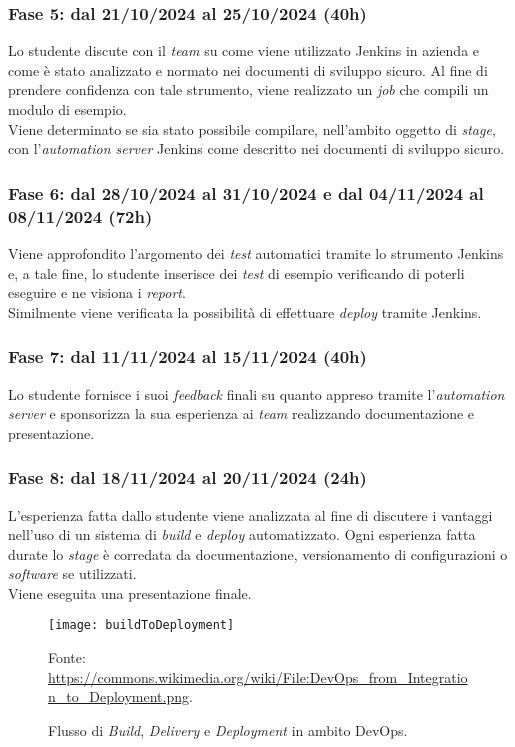 \subsubsection*{Fase 5: dal 21/10/2024 al 25/10/2024 (40h) }
Lo studente discute con il \emph{team} su come viene utilizzato Jenkins in azienda e come è stato analizzato e normato nei documenti di sviluppo sicuro. Al fine di prendere confidenza con tale strumento, viene realizzato un \emph{job} che compili un modulo di esempio.\\
Viene determinato se sia stato possibile compilare, nell'ambito oggetto di \emph{stage}, con l'\emph{automation server} Jenkins come descritto nei documenti di sviluppo sicuro.

\subsubsection*{Fase 6: dal 28/10/2024 al 31/10/2024 e dal 04/11/2024 al 08/11/2024 (72h)}
Viene approfondito l'argomento dei \emph{test} automatici tramite lo strumento Jenkins e, a tale fine, lo studente inserisce dei \emph{test} di esempio verificando di poterli eseguire e ne visiona i \emph{report}.\\
Similmente viene verificata la possibilità di effettuare \emph{deploy} tramite Jenkins.

\subsubsection*{Fase 7: dal 11/11/2024 al 15/11/2024 (40h) }
Lo studente fornisce i suoi \emph{feedback} finali su quanto appreso tramite l'\emph{automation server} e sponsorizza la sua esperienza ai \emph{team} realizzando documentazione e presentazione.

\subsubsection*{Fase 8: dal 18/11/2024 al 20/11/2024 (24h) }
L'esperienza fatta dallo studente viene analizzata al fine di discutere i vantaggi nell'uso di un sistema di \emph{build} e \emph{deploy} automatizzato. Ogni esperienza fatta durate lo \emph{stage} è corredata da documentazione, versionamento di configurazioni o \emph{software} se utilizzati.\\
Viene eseguita una presentazione finale.\\
\begin{figure}[htbp] 
    \centering 
    \texttt{[image: buildToDeployment]}
    \caption{Flusso di \emph{Build}, \emph{Delivery} e \emph{Deployment} in ambito DevOps.} 
    \label{fig:buildToDeployment}
    \vspace{1mm}
    Fonte: \url{https://commons.wikimedia.org/wiki/File:DevOps_from_Integration_to_Deployment.png}.
\end{figure}

